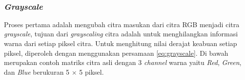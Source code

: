 \begin{adjustbox}{width=1\textwidth}
	\noindent
	\begin{minipage}{\linewidth}
		\label{fig:SkemaAlurPendeteksianPlat}
	\end{minipage}
\end{adjustbox}\\

\subsubsection{\textit{Grayscale}}
\noindent Proses pertama adalah mengubah citra masukan dari citra RGB menjadi citra \textit{grayscale}, tujuan dari \textit{grayscaling} citra adalah untuk menghilangkan informasi warna dari setiap piksel citra. Untuk menghitung nilai derajat keabuan setiap piksel, diperoleh dengan menggunakan persamaan \ref{eq:grayscale}.
\noindent Di bawah merupakan contoh matriks citra asli dengan 3 \textit{channel} warna yaitu \textit{Red}, \textit{Green}, dan \textit{Blue} berukuran 5 $\times$ 5 piksel. 

\begin{adjustbox}{width=1\textwidth}
	\noindent\begin{minipage}{\linewidth}
		\label{fig:MatriksCitraAsal}
	\end{minipage}
\end{adjustbox} 

